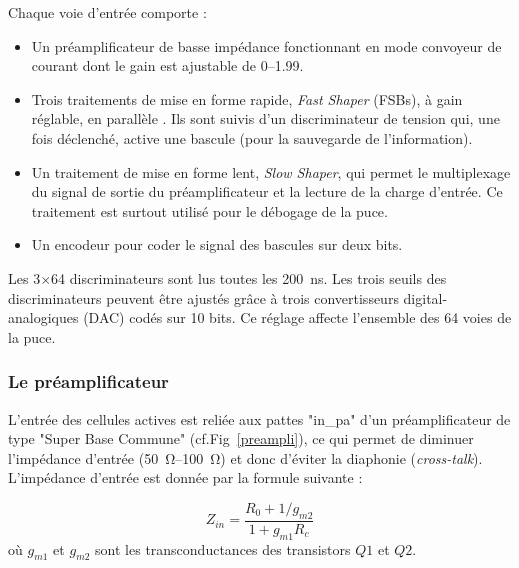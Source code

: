 Chaque voie d'entrée comporte :
\begin{itemize}[label=$\bullet$]
	\item Un préamplificateur de basse impédance fonctionnant en mode convoyeur de courant dont le gain est ajustable de \SIrange{0}{1.99}{}.
	\item Trois traitements de mise en forme rapide, \textit{Fast Shaper} (FSBs), à gain réglable, en parallèle . Ils sont suivis d'un discriminateur de tension qui, une fois déclenché, active une bascule (pour la sauvegarde de l'information).
	\item Un traitement de mise en forme lent, \textit{Slow Shaper}, qui permet le multiplexage du signal de sortie du préamplificateur et la lecture de la charge d'entrée. Ce traitement est surtout utilisé pour le débogage de la puce.
	\item Un encodeur pour coder le signal des bascules sur deux bits.
\end{itemize}

Les \num{3}$\times$\num{64} discriminateurs sont lus toutes les \SI{200}{\nano\second}. Les trois seuils des discriminateurs peuvent être ajustés grâce à trois convertisseurs digital-analogiques (DAC) codés sur \num{10} bits. Ce réglage affecte l'ensemble des \num{64} voies de la puce.

\subsubsection{Le préamplificateur}
L'entrée des cellules actives est reliée aux pattes "in\_pa" d'un préamplificateur de type "Super Base Commune" (cf.Fig~\ref{preampli}), ce qui permet de diminuer l'impédance d'entrée (\SIrange{50}{100}{\ohm}) et donc d'éviter la diaphonie (\textit{cross-talk}). L'impédance d'entrée est donnée par la formule suivante :

\begin{equation}
Z_{in}=\frac{R_0+1/g_{m2}}{1+g_{m1}R_c}
\end{equation}
où $g_{m1}$ et $g_{m2}$ sont les transconductances des transistors $Q1$ et $Q2$.

